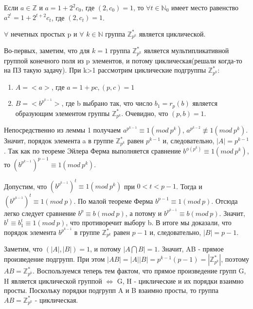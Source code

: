 \begin{lemma}
	Если $a \in \mathbb{Z}$ и $a = 1 + 2^{2}c_{0}$, где $(2,c_{0}) = 1$, то $\forall t \in \mathbb{N}_{0}$ имеет место равенство
	$a^{2^{t}} = 1+2^{t+2}c_{t}$, где $(2,c_{t})=1$.
\end{lemma}

\begin{proofs}
	$\forall$ нечетных простых p и $\forall$ $k \in \mathbb{N}$ группа $\mathbb{Z}_{p^{k}}^{*}$ является циклической.
	\begin{dokvo}
		Во-первых, заметим, что для $k=1$ группа $\mathbb{Z}_{p^{k}}^{*}$ является мультипликативной группой конечного поля из p элементов, и потому циклическая(решали когда-то на ПЗ такую задачу). При k>1 рассмотрим циклические подгруппы $\mathbb{Z}_{p^{k}}^{*}$:
		\begin{enumerate}
			\item $A=<a>$, где $a = 1 + pc, (p,c) = 1$
			\item $B=<b^{p^{k-1}}>$, где b выбрано так, что число $b_{1} = r_{p}(b)$ является образующим элементом группы $\mathbb{Z}_{p^{k}}^{*}$. Очевидно, что $(p,b)=1$.
		\end{enumerate}
		Непосредственно из леммы 1 получаем $a^{p^{k-1}} \equiv 1 (mod\ p^{k})$, $a^{p^{k-2}} \not\equiv 1 (mod\ p^{k})$. Значит, порядок элемента a в группе $\mathbb{Z}_{p^{k}}^{*}$ равен $p^{k-1}$ и, следовательно, $|A| = p^{k-1}$.
		Так как по теореме Эйлера Ферма выполняется сравнение $b^{\phi(p^{k})} \equiv 1 (mod\ p^{k})$, то $(b^{p^{k-1}})^{p-1} \equiv 1 (mod\ p^{k})$.

		Допустим, что $(b^{p^{k-1}})^t \equiv 1(mod\ p^{k})$ при $0 < t < p-1$. Тогда и $(b^{p^{k-1}})^t \equiv 1(mod\ p)$. По малой теореме Ферма $b^{p-1} \equiv 1 (mod\ p)$. Отсюда легко следует сравнение $b^{p} \equiv b (mod\ p)$, а потому и $b^{p^{k-1}} \equiv b (mod\ p)$. Значит, $b^t \equiv b^{t}_{1} \equiv 1 (mod\ p)$, что противоречит выбору b. В итоге мы доказали, что порядок элемента $b^{p^{k-1}}$ в группе $\mathbb{Z}_{p^{k}}^{*}$ равен $p-1$ и, следовательно, $|B| = p-1$.

		Заметим, что $(|A|,|B|) = 1$, и потому $|A \bigcap B|=1$. Значит, AB - прямое произведение подгрупп. При этом $|AB|=|A||B|=p^{k-1}(p-1)=|\mathbb{Z}_{p^{k}}^{*}|$, поэтому $AB = \mathbb{Z}_{p^{k}}^{*}$.
		Воспользуемся теперь тем фактом, что прямое произведение групп G, H является циклической группой $\Leftrightarrow$ G, H - циклические и их порядки взаимно просты.
		Поскольку порядки подгрупп A и B взаимно просты, то группа $AB = \mathbb{Z}_{p^{k}}^{*}$ - циклическая.
	\end{dokvo}
\end{proofs}

